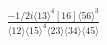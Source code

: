 \documentclass[varwidth, border=5pt]{standalone}
\begin{document}
\begin{my}
$\begin{gathered}
\scriptscriptstyle\frac{-1/2i\langle13\rangle^4[16]\langle56\rangle^3}{\langle12\rangle\langle15\rangle^4\langle23\rangle\langle34\rangle\langle45\rangle}
\end{gathered}$
\end{my}
\end{document}
